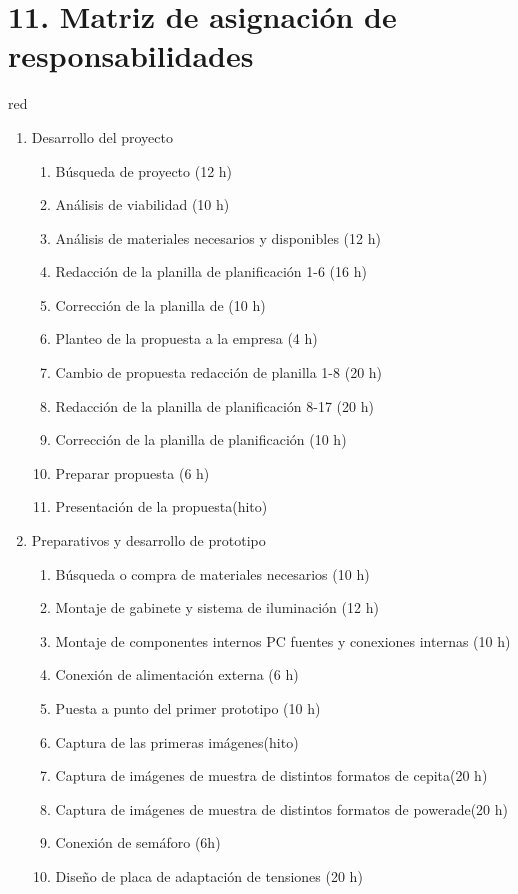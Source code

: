 \documentclass[11pt]{charter}
\begin{document}
\section{11. Matriz de asignación de responsabilidades}
\label{sec:responsabilidades}
\begin{consigna}{red}
\begin{enumerate}
\item Desarrollo del proyecto 
	\begin{enumerate}
	\item Búsqueda de proyecto (12 h)
	\item Análisis de viabilidad (10 h)
	\item Análisis de materiales necesarios y disponibles (12 h)
	\item Redacción de la planilla de planificación 1-6 (16 h)
	\item Corrección de la planilla de  (10 h)
	\item Planteo de la propuesta a la empresa (4 h)
	\item Cambio de propuesta redacción de planilla 1-8 (20 h)
	\item Redacción de la planilla de planificación 8-17 (20 h)
	\item Corrección de la planilla de planificación (10 h)
	\item Preparar propuesta (6 h)
	\item Presentación de la propuesta(hito)
	\end{enumerate}
\item Preparativos y desarrollo de prototipo
\begin{enumerate}
	\item Búsqueda o compra de materiales necesarios (10 h)
	\item Montaje de gabinete y sistema de iluminación (12 h)
	\item Montaje de componentes internos PC fuentes y conexiones internas (10 h)
	\item Conexión de alimentación externa (6 h)
	\item Puesta a punto del primer prototipo (10 h)
	\item Captura de las primeras imágenes(hito)
	\item Captura de imágenes de muestra de distintos formatos de cepita(20 h) 
	\item Captura de imágenes de muestra de distintos formatos de powerade(20 h)
	\item Conexión de semáforo (6h)
	\item Diseño de placa de adaptación de tensiones (20 h)

\end{enumerate}
\end{enumerate}
\end{consigna}
\end{document}
